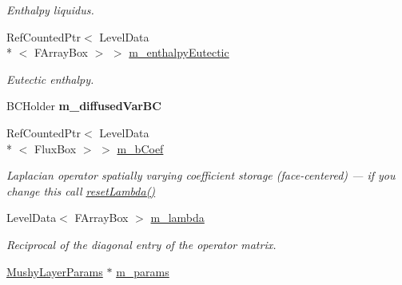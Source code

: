 \begin{DoxyCompactItemize}
\begin{DoxyCompactList}\small\item\em Enthalpy liquidus. \end{DoxyCompactList}\item 
\hypertarget{class_a_m_r_non_linear_multi_comp_op_a84014ea27489edc10ca99fd27e3fa59b}{Ref\-Counted\-Ptr$<$ Level\-Data\\*
$<$ F\-Array\-Box $>$ $>$ \hyperlink{class_a_m_r_non_linear_multi_comp_op_a84014ea27489edc10ca99fd27e3fa59b}{m\-\_\-enthalpy\-Eutectic}}\label{class_a_m_r_non_linear_multi_comp_op_a84014ea27489edc10ca99fd27e3fa59b}

\begin{DoxyCompactList}\small\item\em Eutectic enthalpy. \end{DoxyCompactList}\item 
\hypertarget{class_a_m_r_non_linear_multi_comp_op_a84251f9cbb92946cd0eba54571ba0010}{B\-C\-Holder {\bfseries m\-\_\-diffused\-Var\-B\-C}}\label{class_a_m_r_non_linear_multi_comp_op_a84251f9cbb92946cd0eba54571ba0010}

\item 
\hypertarget{class_a_m_r_non_linear_multi_comp_op_a585689df6d0c8fe37528664bad748725}{Ref\-Counted\-Ptr$<$ Level\-Data\\*
$<$ Flux\-Box $>$ $>$ \hyperlink{class_a_m_r_non_linear_multi_comp_op_a585689df6d0c8fe37528664bad748725}{m\-\_\-b\-Coef}}\label{class_a_m_r_non_linear_multi_comp_op_a585689df6d0c8fe37528664bad748725}

\begin{DoxyCompactList}\small\item\em Laplacian operator spatially varying coefficient storage (face-\/centered) --- if you change this call \hyperlink{class_a_m_r_non_linear_multi_comp_op_aa558902d2bd88e41dff404c6b3ae206f}{reset\-Lambda()} \end{DoxyCompactList}\item 
\hypertarget{class_a_m_r_non_linear_multi_comp_op_afc96721bca344bb2d470d7f0731b4285}{Level\-Data$<$ F\-Array\-Box $>$ \hyperlink{class_a_m_r_non_linear_multi_comp_op_afc96721bca344bb2d470d7f0731b4285}{m\-\_\-lambda}}\label{class_a_m_r_non_linear_multi_comp_op_afc96721bca344bb2d470d7f0731b4285}

\begin{DoxyCompactList}\small\item\em Reciprocal of the diagonal entry of the operator matrix. \end{DoxyCompactList}\item 
\hypertarget{class_a_m_r_non_linear_multi_comp_op_aafb3edc6ac424eb1e6f7bbc9a15c1c9e}{\hyperlink{class_mushy_layer_params}{Mushy\-Layer\-Params} $\ast$ \hyperlink{class_a_m_r_non_linear_multi_comp_op_aafb3edc6ac424eb1e6f7bbc9a15c1c9e}{m\-\_\-params}}\label{class_a_m_r_non_linear_multi_comp_op_aafb3edc6ac424eb1e6f7bbc9a15c1c9e}


\end{DoxyCompactItemize}
